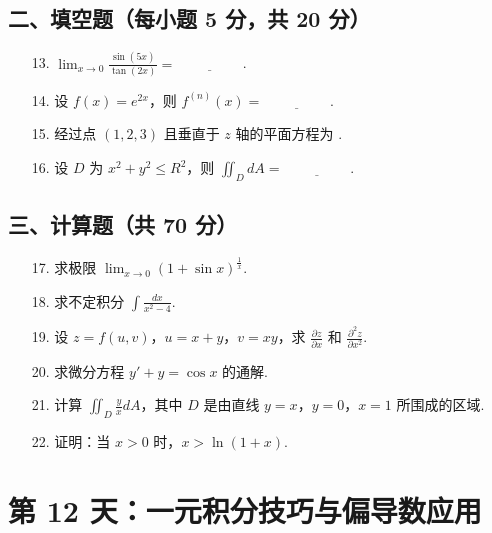\documentclass[11pt,a4paper]{article}
\begin{document}
\subsection*{二、填空题（每小题 5 分，共 20 分）}
\begin{enumerate}
    \item[13.] $\lim_{x \to 0} \frac{\sin(5x)}{\tan(2x)} = \underline{\hspace{2cm}}$.
    \item[14.] 设 $f(x) = e^{2x}$，则 $f^{(n)}(x) = \underline{\hspace{2cm}}$.
    \item[15.] 经过点 $(1, 2, 3)$ 且垂直于 $z$ 轴的平面方程为 \underline{\hspace{2cm}}.
    \item[16.] 设 $D$ 为 $x^2+y^2 \le R^2$，则 $\iint_D dA = \underline{\hspace{2cm}}. $
\end{enumerate}
\subsection*{三、计算题（共 70 分）}
\begin{enumerate}
    \item[17.] 求极限 $\lim_{x \to 0} (1 + \sin x)^{\frac{1}{x}}$.
    \item[18.] 求不定积分 $\int \frac{dx}{x^2 - 4}$.
    \item[19.] 设 $z = f(u, v)$，$u = x+y$，$v = xy$，求 $\frac{\partial z}{\partial x}$ 和 $\frac{\partial^2 z}{\partial x^2}$.
    \item[20.] 求微分方程 $y' + y = \cos x$ 的通解.
    \item[21.] 计算 $\iint_D \frac{y}{x} dA$，其中 $D$ 是由直线 $y=x$，$y=0$，$x=1$ 所围成的区域.
    \item[22.] 证明：当 $x > 0$ 时，$x > \ln(1+x)$.
\end{enumerate}

\newpage

\section*{第 12 天：一元积分技巧与偏导数应用}
\end{document}
